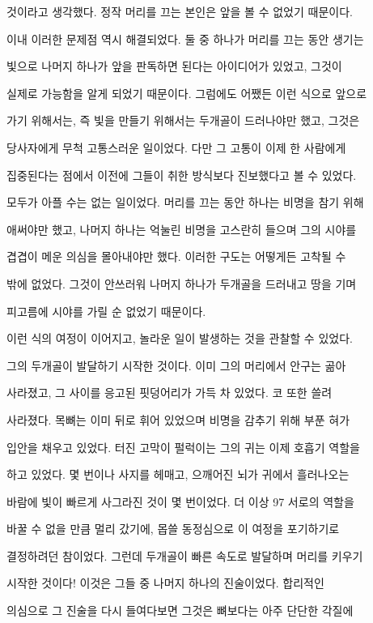 것이라고 생각했다. 정작 머리를 끄는 본인은 앞을 볼 수 없었기 때문이다.



이내 이러한 문제점 역시 해결되었다. 둘 중 하나가 머리를 끄는 동안 생기는

빛으로 나머지 하나가 앞을 판독하면 된다는 아이디어가 있었고, 그것이

실제로 가능함을 알게 되었기 때문이다. 그럼에도 어쨌든 이런 식으로 앞으로

가기 위해서는, 즉 빛을 만들기 위해서는 두개골이 드러나야만 했고, 그것은

당사자에게 무척 고통스러운 일이었다. 다만 그 고통이 이제 한 사람에게

집중된다는 점에서 이전에 그들이 취한 방식보다 진보했다고 볼 수 있었다.

모두가 아플 수는 없는 일이었다. 머리를 끄는 동안 하나는 비명을 참기 위해

애써야만 했고, 나머지 하나는 억눌린 비명을 고스란히 들으며 그의 시야를

겹겹이 메운 의심을 몰아내야만 했다. 이러한 구도는 어떻게든 고착될 수

밖에 없었다. 그것이 안쓰러워 나머지 하나가 두개골을 드러내고 땅을 기며

피고름에 시야를 가릴 순 없었기 때문이다.



이런 식의 여정이 이어지고, 놀라운 일이 발생하는 것을 관찰할 수 있었다.

그의 두개골이 발달하기 시작한 것이다. 이미 그의 머리에서 안구는 곪아

사라졌고, 그 사이를 응고된 핏덩어리가 가득 차 있었다. 코 또한 쓸려

사라졌다. 목뼈는 이미 뒤로 휘어 있었으며 비명을 감추기 위해 부푼 혀가

입안을 채우고 있었다. 터진 고막이 펄럭이는 그의 귀는 이제 호흡기 역할을

하고 있었다. 몇 번이나 사지를 헤매고, 으깨어진 뇌가 귀에서 흘러나오는

바람에 빛이 빠르게 사그라진 것이 몇 번이었다. 더 이상 97 서로의 역할을

바꿀 수 없을 만큼 멀리 갔기에, 몹쓸 동정심으로 이 여정을 포기하기로

결정하려던 참이었다. 그런데 두개골이 빠른 속도로 발달하며 머리를 키우기

시작한 것이다! 이것은 그들 중 나머지 하나의 진술이었다. 합리적인

의심으로 그 진술을 다시 들여다보면 그것은 뼈보다는 아주 단단한 각질에

